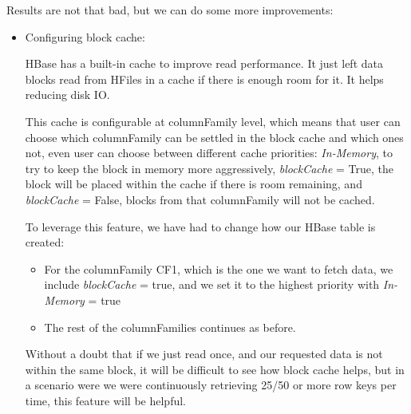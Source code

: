 \bigskip

Results are not that bad, but we can do some more improvements:
\begin{itemize}
\item Configuring block cache:
\par 
HBase has a built-in cache to improve read performance. It just left data blocks read from HFiles in a cache if there is enough room for it. It helps reducing disk IO.
\par
 This cache is configurable at columnFamily level, which means that user can choose which columnFamily can be settled in the block cache and which ones not, even user can choose between different cache priorities: \textit{In-Memory}, to try to keep the block in memory more aggressively, \textit{blockCache} = True, the block will be placed within the cache if there is room remaining, and \textit{blockCache} = False, blocks from that columnFamily will not be cached.
\par 
To leverage this feature, we have had to change how our HBase table is created: 
\begin{itemize}
\item For the columnFamily CF1, which is the one we want to fetch data, we include \textit{blockCache} = true, and we set it to the highest priority with \textit{In-Memory} = true
\item The rest of the columnFamilies continues as before.
\end{itemize}

Without a doubt that if we just read once, and our requested data is not within the same block, it will be difficult to see how block cache helps, but in a scenario were we were continuously retrieving 25/50 or more row keys per time, this feature will be helpful.




\end{itemize}

